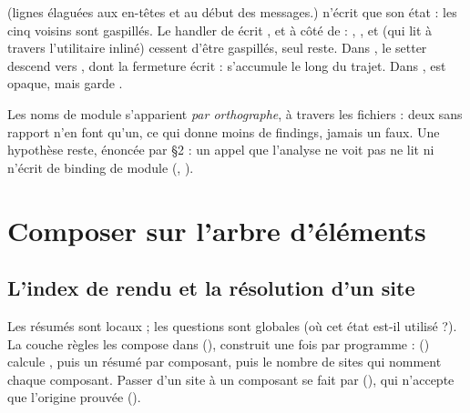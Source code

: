 
(lignes élaguées aux en-têtes et au début des messages.)  n'écrit que son état :
les cinq voisins sont gaspillés. Le handler de  écrit , 
et  à côté de  : , ,  et 
(qui lit  à travers l'utilitaire  inliné) cessent d'être gaspillés,
seul  reste. Dans , le setter descend vers , dont la
fermeture écrit  :  s'accumule le long du trajet. Dans ,
 est opaque, mais  garde .

\begin{remarque}
Les noms de module s'apparient \emph{par orthographe}, à travers les fichiers : deux
 sans rapport n'en font qu'un, ce qui donne moins de findings, jamais un faux. Une
hypothèse reste, énoncée par  §2 : un appel que l'analyse ne voit pas ne lit ni n'écrit
de binding de module (, ).
\end{remarque}

\section{Composer sur l'arbre d'éléments}
\label{sec:inter-composants-arbre}

\subsection{L'index de rendu et la résolution d'un site}

Les résumés sont locaux ; les questions sont globales (\og où cet état est-il utilisé ?\fg). La
couche règles les compose dans  (),
construit une fois par programme :  ()
calcule , puis un résumé par composant, puis le nombre de sites qui nomment chaque
composant. Passer d'un site à un composant se fait par 
(), qui n'accepte que l'origine prouvée
().


